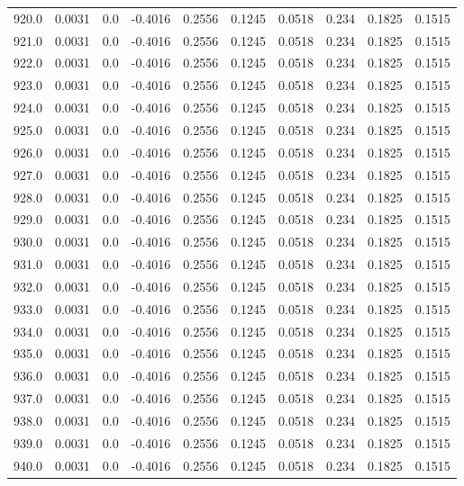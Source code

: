 \begin{longtable}{lrrrrrrrrr}
920.0 & 0.0031 & 0.0 & -0.4016 & 0.2556 & 0.1245 & 0.0518 & 0.234 & 0.1825 & 0.1515 \\
921.0 & 0.0031 & 0.0 & -0.4016 & 0.2556 & 0.1245 & 0.0518 & 0.234 & 0.1825 & 0.1515 \\
922.0 & 0.0031 & 0.0 & -0.4016 & 0.2556 & 0.1245 & 0.0518 & 0.234 & 0.1825 & 0.1515 \\
923.0 & 0.0031 & 0.0 & -0.4016 & 0.2556 & 0.1245 & 0.0518 & 0.234 & 0.1825 & 0.1515 \\
924.0 & 0.0031 & 0.0 & -0.4016 & 0.2556 & 0.1245 & 0.0518 & 0.234 & 0.1825 & 0.1515 \\
925.0 & 0.0031 & 0.0 & -0.4016 & 0.2556 & 0.1245 & 0.0518 & 0.234 & 0.1825 & 0.1515 \\
926.0 & 0.0031 & 0.0 & -0.4016 & 0.2556 & 0.1245 & 0.0518 & 0.234 & 0.1825 & 0.1515 \\
927.0 & 0.0031 & 0.0 & -0.4016 & 0.2556 & 0.1245 & 0.0518 & 0.234 & 0.1825 & 0.1515 \\
928.0 & 0.0031 & 0.0 & -0.4016 & 0.2556 & 0.1245 & 0.0518 & 0.234 & 0.1825 & 0.1515 \\
929.0 & 0.0031 & 0.0 & -0.4016 & 0.2556 & 0.1245 & 0.0518 & 0.234 & 0.1825 & 0.1515 \\
930.0 & 0.0031 & 0.0 & -0.4016 & 0.2556 & 0.1245 & 0.0518 & 0.234 & 0.1825 & 0.1515 \\
931.0 & 0.0031 & 0.0 & -0.4016 & 0.2556 & 0.1245 & 0.0518 & 0.234 & 0.1825 & 0.1515 \\
932.0 & 0.0031 & 0.0 & -0.4016 & 0.2556 & 0.1245 & 0.0518 & 0.234 & 0.1825 & 0.1515 \\
933.0 & 0.0031 & 0.0 & -0.4016 & 0.2556 & 0.1245 & 0.0518 & 0.234 & 0.1825 & 0.1515 \\
934.0 & 0.0031 & 0.0 & -0.4016 & 0.2556 & 0.1245 & 0.0518 & 0.234 & 0.1825 & 0.1515 \\
935.0 & 0.0031 & 0.0 & -0.4016 & 0.2556 & 0.1245 & 0.0518 & 0.234 & 0.1825 & 0.1515 \\
936.0 & 0.0031 & 0.0 & -0.4016 & 0.2556 & 0.1245 & 0.0518 & 0.234 & 0.1825 & 0.1515 \\
937.0 & 0.0031 & 0.0 & -0.4016 & 0.2556 & 0.1245 & 0.0518 & 0.234 & 0.1825 & 0.1515 \\
938.0 & 0.0031 & 0.0 & -0.4016 & 0.2556 & 0.1245 & 0.0518 & 0.234 & 0.1825 & 0.1515 \\
939.0 & 0.0031 & 0.0 & -0.4016 & 0.2556 & 0.1245 & 0.0518 & 0.234 & 0.1825 & 0.1515 \\
940.0 & 0.0031 & 0.0 & -0.4016 & 0.2556 & 0.1245 & 0.0518 & 0.234 & 0.1825 & 0.1515 \\

\end{longtable}
